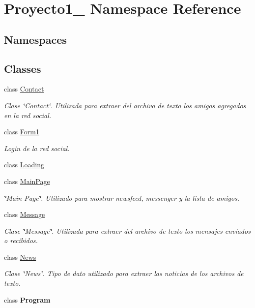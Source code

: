 \hypertarget{namespace_proyecto1__1096917}{}\section{Proyecto1\+\_ Namespace Reference}
\label{namespace_proyecto1__1096917}
\subsection*{Namespaces}
\begin{DoxyCompactItemize}
\end{DoxyCompactItemize}
\subsection*{Classes}
\begin{DoxyCompactItemize}
\item 
class \mbox{\hyperlink{class_proyecto1__1096917_1_1_contact}{Contact}}
\begin{DoxyCompactList}\small\item\em Clase \char`\"{}\+Contact\char`\"{}. Utilizada para extraer del archivo de texto los amigos agregados en la red social. \end{DoxyCompactList}\item 
class \mbox{\hyperlink{class_proyecto1__1096917_1_1_form1}{Form1}}
\begin{DoxyCompactList}\small\item\em Login de la red social. \end{DoxyCompactList}\item 
class \mbox{\hyperlink{class_proyecto1__1096917_1_1_loading}{Loading}}
\item 
class \mbox{\hyperlink{class_proyecto1__1096917_1_1_main_page}{Main\+Page}}
\begin{DoxyCompactList}\small\item\em \char`\"{}\+Main Page\char`\"{}. Utilizado para mostrar newsfeed, messenger y la lista de amigos. \end{DoxyCompactList}\item 
class \mbox{\hyperlink{class_proyecto1__1096917_1_1_message}{Message}}
\begin{DoxyCompactList}\small\item\em Clase \char`\"{}\+Message\char`\"{}. Utilizada para extraer del archivo de texto los mensajes enviados o recibidos. \end{DoxyCompactList}\item 
class \mbox{\hyperlink{class_proyecto1__1096917_1_1_news}{News}}
\begin{DoxyCompactList}\small\item\em Clase \char`\"{}\+News\char`\"{}. Tipo de dato utilizado para extraer las noticias de los archivos de texto. \end{DoxyCompactList}\item 
class {\bfseries Program}
\end{DoxyCompactItemize}

